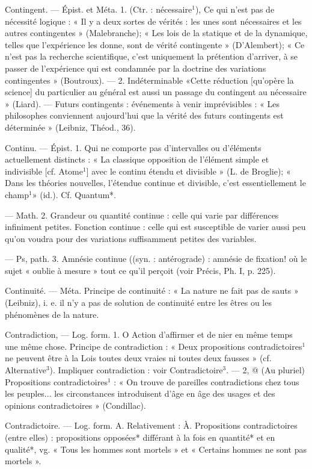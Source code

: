 Contingent. — Épist. et Méta. 1. (Ctr. :
nécessaire$^1$), Ce qui n'est pas de nécessité logique : « Il y a deux sortes
de vérités : les unes sont nécessaires
et les autres contingentes » (Malebranche); « Les lois de la statique
et de la dynamique, telles que l’expérience les donne, sont de vérité
contingente » (D’Alembert); « Ce
n’est pas la recherche scientifique,
c’est uniquement la prétention d’arriver, à se passer de l'expérience qui
est condamnée par la doctrine des
variations contingentes »  (Boutroux). — 2. Indéterminable
«Cette réduction [qu’opère la science]
du particulier au général est aussi
un passage du contingent au nécessaire » (Liard). — Futurs contingents : événements à venir imprévisibles : « Les philosophes conviennent aujourd'hui que la vérité des
futurs contingents est déterminée »
(Leibniz, Théod., 36).

Continu. — Épist. 1. Qui ne comporte
pas d'intervalles ou d'éléments
actuellement distincts : « La classique
opposition de l'élément simple
et indivisible [cf. Atome$^1$] avec le
continu étendu et divisible » (L. de
Broglie); « Dans les théories nouvelles, l'étendue continue et divisible, c'est essentiellement le champ$^1$»
(id.). Cf. Quantum*.

— Math. 2. Grandeur ou quantité
continue : celle qui varie par différences infiniment petites. Fonction
continue : celle qui est susceptible de
varier aussi peu qu’on voudra pour
des variations suffisamment petites
des variables.

— Ps, path. 3. Amnésie continue
((syn. : antérograde) : amnésie de
fixation! où le sujet « oublie à mesure » tout ce qu'il perçoit (voir
Précis, Ph. I, p. 225).

Continuité. — Méta. Principe de continuité : « La nature ne fait pas de
sauts » (Leibniz), i. e. il n’y a pas de
solution de continuité entre les êtres
ou les phénomènes de la nature.

Contradiction, — Log. form. 1. O
Action d'affirmer et de nier en même
temps une même chose. Principe de
contradiction : « Deux propositions
contradictoires$^1$ ne peuvent être à la
Lois toutes deux vraies ni toutes deux
fausses » (cf. Alternative$^3$). Impliquer contradiction : voir Contradictoire$^3$. — 2, @ (Au pluriel) Propositions contradictoires$^1$ : « On trouve
de pareilles contradictions chez
tous les peuples... les circonstances
introduisent d'âge en âge des usages
et des opinions contradictoires »
(Condillac).

Contradictoire. — Log. form. A. Relativement : À. Propositions contradictoires (entre elles) : propositions
opposées* différant à la fois en
quantité* et en qualité*, vg. « Tous
les hommes sont mortels » et « Certains hommes ne sont pas mortels ».

